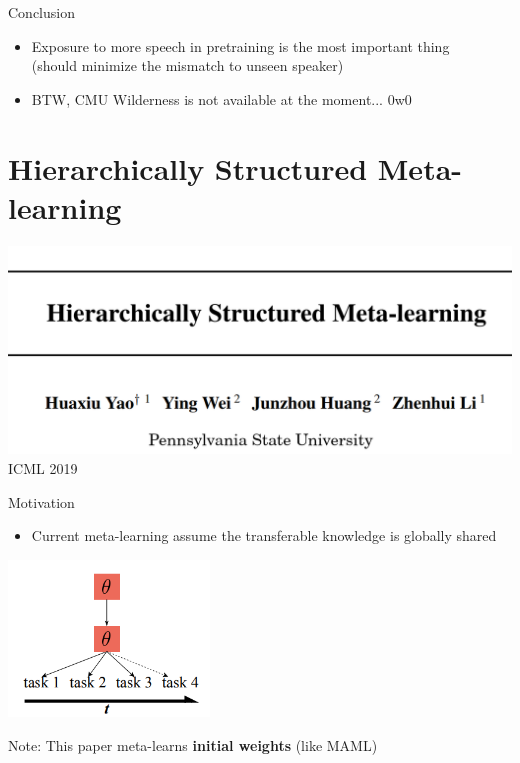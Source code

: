 \documentclass{beamer}
\begin{document}
\begin{frame}{Conclusion}
  \begin{itemize}
    \item Exposure to more speech in pretraining is the most important thing\\
      (should minimize the mismatch to unseen speaker)

      \item BTW, CMU Wilderness is not available at the moment... 0w0
  \end{itemize}
\end{frame}


\section{Hierarchically Structured Meta-learning}
\begin{frame}
  \includegraphics[width=\textwidth]{fig/p3-title.png}
  \center ICML 2019
\end{frame}

\begin{frame}{Motivation}
  \begin{itemize}
    \item Current meta-learning assume the transferable knowledge is globally shared
  \end{itemize}
    \center \includegraphics[width=0.4\textwidth]{fig/p3-global.png}

  Note: This paper meta-learns \textbf{initial weights} (like MAML)
\end{frame}
\end{document}
